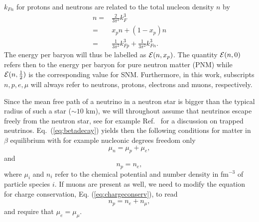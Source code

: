 $k_{Fn}$ for protons and neutrons are related to the total nucleon density
$n$ by
\begin{align}
     n = & \frac{2}{3\pi^2} k_F^3 \nonumber \\
       = & x_p n + (1-x_p) n \nonumber \\
       = & \frac{1}{3\pi^2} k_{Fp}^3 + \frac{1}{3\pi^2} k_{Fn}^3.
    \label{eq:densi}
\end{align}
The energy per baryon will thus be
labelled as ${\cal E}(n,x_p)$. The quantity
${\cal E}(n,0)$ refers then to the energy per baryon for pure neutron
matter (PNM) while ${\cal E}(n,\frac{1}{2})$ is the corresponding value for 
SNM. Furthermore, in this work, subscripts $n,p,e,\mu$
will always refer to neutrons, protons, electrons and muons, respectively.


Since the mean free path of a neutrino in a neutron star is bigger
than the typical radius of such a star ($\sim 10$ km), 
we will throughout assume that neutrinos escape freely from the neutron star,
see for example  Ref.~\cite{prakash2006}
for a discussion
on trapped neutrinos. Eq.~(\ref{eq:betadecay}) yields then the following
conditions for matter in $\beta$ equilibrium with for example  nucleonic degrees 
freedom only
\begin{equation}
    \mu_n=\mu_p+\mu_e,
     \label{eq:npebetaequilibrium}
\end{equation}
and 
\begin{equation}
     n_p = n_e,
     \label{eq:chargeconserv}
\end{equation}
where $\mu_i$ and $n_i$ refer to the chemical potential and number density
in fm$^{-3}$ of particle species $i$. 
If muons are present as well,  we need to modify the equation for 
charge conservation, Eq. (\ref{eq:chargeconserv}), to read 
\[
     n_p = n_e+n_{\mu},
\]
and require that $\mu_e = \mu_{\mu}$.

